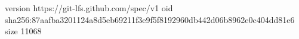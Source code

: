 version https://git-lfs.github.com/spec/v1
oid sha256:87aafba3201124a8d5eb69211f3e9f5f8192960db442d06b8962e0c404dd81e6
size 11068
